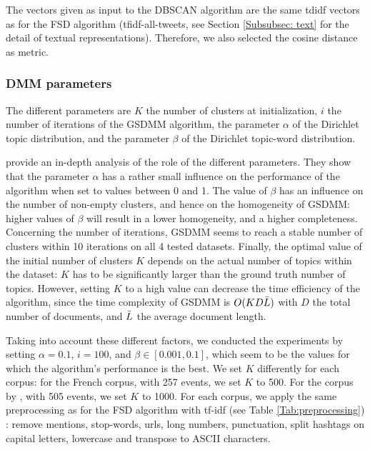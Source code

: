 The vectors given as input to the DBSCAN algorithm are the same tdidf vectors as for the FSD algorithm (tfidf-all-tweets, see Section \ref{Subsubsec: text} for the detail of textual representations). Therefore, we also selected the cosine distance as metric.

\subsubsection{DMM parameters}
 The different parameters are $K$ the number of clusters at initialization, $i$ the number of iterations of the GSDMM algorithm, the parameter $\alpha$ of the Dirichlet topic distribution, and the parameter $\beta$ of the Dirichlet topic-word distribution.

\citet{yin_dirichlet_2014} provide an in-depth analysis of the role of the different parameters. They show that the parameter $\alpha$ has a rather small influence on the performance of the algorithm when set to values between 0 and 1. The value of $\beta$ has an influence on the number of non-empty clusters, and hence on the homogeneity of GSDMM: higher values of $\beta$ will result in a lower homogeneity, and a higher completeness. Concerning the number of iterations, GSDMM seems to reach a stable number of clusters within 10 iterations on all 4 tested datasets. Finally, the optimal value of the initial number of clusters $K$ depends on the actual number of topics within the dataset: $K$ has to be significantly larger than the ground truth number of topics. However, setting $K$ to a high value can decrease the time efficiency of the algorithm, since the time complexity of GSDMM is $O(KD\Bar{L})$ with $D$ the total number of documents, and $\Bar{L}$ the average document length.

Taking into account these different factors, we conducted the experiments by setting $\alpha=0.1$, $i=100$, and $\beta \in [0.001, 0.1]$, which seem to be the values for which the algorithm's performance is the best. We set $K$ differently for each corpus: for the French corpus, with 257 events, we set $K$ to 500. For the corpus by \citet{mcminn_building_2013}, with 505 events, we set $K$ to 1000. For each corpus, we apply the same preprocessing as for the FSD algorithm with tf-idf (see Table \ref{Tab:preprocessing}) : remove mentions, stop-words, urls, long numbers, punctuation, split hashtags on capital letters, lowercase and transpose to ASCII characters.


